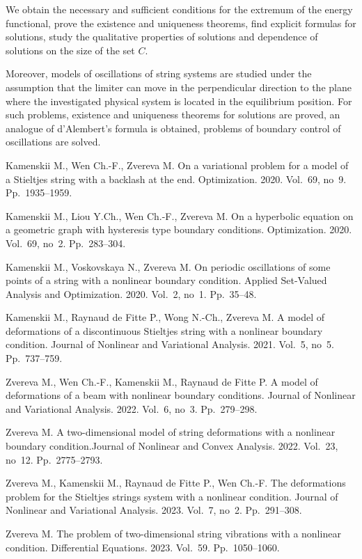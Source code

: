\documentclass[12pt]{llncs}
\begin{document}
We obtain the necessary and sufficient
conditions for the extremum of the energy functional, prove the
existence and uniqueness theorems, find  explicit
formulas for  solutions, study the qualitative properties of solutions and  dependence of solutions on the size of
the set $C$.

Moreover, models of oscillations of string systems are studied under the assumption that the limiter can move in the perpendicular direction to the plane where the investigated  physical system is located in the equilibrium position. For such problems, existence and uniqueness theorems for solutions are proved,  an analogue of d'Alembert's formula is obtained, problems of boundary control of oscillations are solved.


\begin{thebibliography}{9} %


  Kamenskii M., Wen Ch.-F., Zvereva M.  On a variational problem for a model of a Stieltjes string with a backlash at the end. Optimization. 2020. Vol.~69, no~9. Pp.~1935--1959.

  Kamenskii M., Liou Y.Ch., Wen Ch.-F., Zvereva M.  On a hyperbolic equation on a geometric graph with hysteresis type boundary conditions. Optimization. 2020. Vol.~69, no~2. Pp.~283--304.

  Kamenskii M., Voskovskaya N., Zvereva M.  On periodic oscillations of some points of a string with a nonlinear boundary condition.  Applied Set-Valued Analysis and Optimization. 2020. Vol.~2, no~1. Pp.~35--48.
 
  Kamenskii M., Raynaud de Fitte P., Wong N.-Ch., Zvereva M.  A model of deformations of  a discontinuous Stieltjes string with a nonlinear boundary condition. Journal of Nonlinear and Variational Analysis. 2021. Vol.~5, no~5. Pp.~737--759.

 Zvereva M., Wen Ch.-F., Kamenskii M., Raynaud de Fitte P.  A model of deformations of a beam with nonlinear boundary conditions. Journal of Nonlinear and Variational Analysis. 2022. Vol.~6, no~3. Pp.~279--298.

 Zvereva M. A two-dimensional model of string deformations with a nonlinear boundary condition.Journal of Nonlinear and Convex Analysis. 2022. Vol.~23, no~12. Pp.~2775--2793.

 Zvereva M., Kamenskii M., Raynaud de Fitte P., Wen Ch.-F.  The deformations problem for the Stieltjes strings system with a nonlinear condition. Journal of Nonlinear and Variational Analysis. 2023. Vol.~7, no~2. Pp.~291--308.

 Zvereva M. The problem of two-dimensional string vibrations with a nonlinear condition. Differential Equations. 2023. Vol.~59.  Pp.~1050--1060.

\end{thebibliography}
\end{document}
